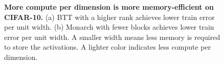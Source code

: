 \documentclass{article}
\theoremstyle{plain}
\theoremstyle{definition}
\theoremstyle{remark}
\begin{document}
\begin{figure}[!t]
\centering
   \caption{ \textbf{More compute per dimension is more memory-efficient on CIFAR-10.}
   (a) BTT with a higher rank achieves lower train error per unit width.
   (b) Monarch with fewer blocks achieves lower train error per unit width. A smaller width means less memory is required to store the activations. A lighter color indicates less compute per dimension.
   }
    \label{fig:memory}
    \vspace{-4mm}
\end{figure}
\end{document}

